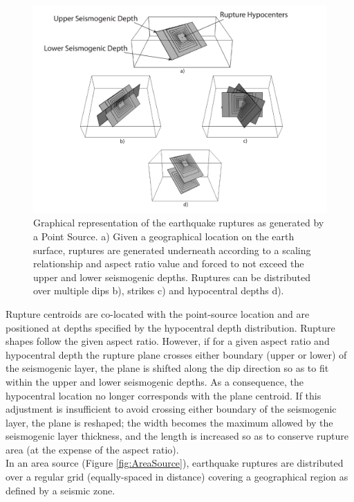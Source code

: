 \begin{figure}
\centering
\includegraphics[width=14cm]{./Pictures/PointSource.pdf}
\caption{Graphical representation of the earthquake ruptures as generated by a Point Source. a) Given a geographical location on the earth surface, ruptures are generated underneath according to a scaling relationship and aspect ratio value and forced to not exceed the upper and lower seismogenic depths. Ruptures can be distributed over multiple dips b), strikes c) and hypocentral depths d).}
\label{fig:PointSource}
\end{figure}
Rupture centroids are co-located with the point-source location and are positioned at depths specified by the hypocentral depth distribution. Rupture shapes follow the given aspect ratio. However, if for a given aspect ratio and hypocentral depth the rupture plane crosses either boundary (upper or lower) of the seismogenic layer, the plane is shifted along the dip direction so as to fit within the upper and lower seismogenic depths. As a consequence, the hypocentral location no longer corresponds with the plane centroid. If this adjustment is insufficient to avoid crossing either boundary of the seismogenic layer, the plane is reshaped; the width becomes the maximum allowed by the seismogenic layer thickness, and the length is increased so as to conserve rupture area (at the expense of the aspect ratio).\\
In an area source (Figure \ref{fig:AreaSource}), earthquake ruptures are distributed over a regular grid (equally-spaced in distance) covering a geographical region as defined by a seismic zone. 
